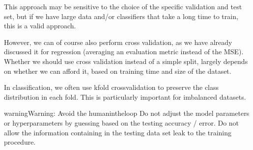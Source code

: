 \documentclass[letterpaper,10pt,english]{jupyterBook}
\let\sphinxpxdimen\pdfpxdimen\else\newdimen\sphinxpxdimen
\begin{document}
\sphinxAtStartPar
This approach may be sensitive to the choice of the specific validation and test set, but if we have large data and/or classifiers that take a long time to train, this is a valid approach.
\begin{center}\end{center}
\sphinxAtStartPar
However, we can of course also perform cross validation, as we have already discussed it for regression (averaging an evaluation metric instead of the MSE). Whether we should use cross validation instead of a simple split, largely depends on whether we can afford it, based on training time and size of the dataset.

\sphinxAtStartPar
In classification, we often use  k\sphinxhyphen{}fold cross\sphinxhyphen{}validation to preserve the class distribution in each fold. This is particularly important for imbalanced datasets.

\begin{sphinxadmonition}{warning}{Warning:}
\sphinxAtStartPar
Avoid the human\sphinxhyphen{}in\sphinxhyphen{}the\sphinxhyphen{}loop
Do not adjust the model parameters or hyper\sphinxhyphen{}parameters by guessing based on the testing accuracy / error. Do not allow the information containing in the testing data set leak to the training procedure.

\begin{figure}[H]
\centering

\noindent\sphinxincludegraphics[height=320\sphinxpxdimen]{{train_validate_test_03}.png}
\end{figure}
\end{sphinxadmonition}
\end{document}
